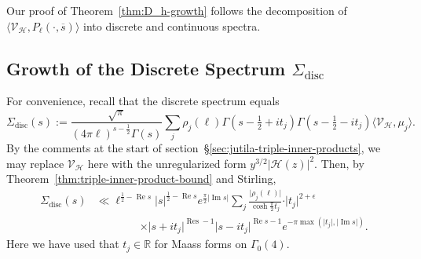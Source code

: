 \documentclass[11pt,reqno]{amsart}
\theoremstyle{plain}
\theoremstyle{definition}
\numberwithin{equation}{section}
\renewcommand{\Im}{\operatorname{Im}}
\renewcommand{\Re}{\operatorname{Re}}
\DeclareMathOperator*{\Res}{Res}
\begin{document}
Our proof of Theorem~\ref{thm:D_h-growth} follows the decomposition of $\langle \mathcal{V}_\mathcal{H}, P_\ell(\cdot,\overline{s}) \rangle$ into discrete and continuous spectra.

\subsection{Growth of the Discrete Spectrum \texorpdfstring{$\Sigma_{\mathrm{disc}}$}{}}

For convenience, recall that the discrete spectrum equals
\[
\Sigma_{\mathrm{disc}}(s) 
		:=  \frac{\sqrt{\pi}}{(4\pi \ell)^{s-\frac{1}{2}} \Gamma(s)}
		\sum_j \rho_j(\ell) \Gamma(s - \tfrac{1}{2} + it_j)\Gamma(s- \tfrac{1}{2} -it_j)
			\langle \mathcal{V}_\mathcal{H}, \mu_j \rangle.
\]
By the comments at the start of section~\S{\ref{sec:jutila-triple-inner-products}}, we may replace $\mathcal{V}_\mathcal{H}$ here with the unregularized form $y^{3/2} \vert \mathcal{H}(z) \vert^2$. Then, by Theorem~\ref{thm:triple-inner-product-bound} and Stirling,
\begin{align*}
	\Sigma_{\mathrm{disc}}(s)
	& \ll \ell^{\frac{1}{2}-\Re s} \vert s \vert^{\frac{1}{2}-\Re s}
		e^{\frac{\pi}{2} \vert \Im s \vert}
	\sum_j \frac{\vert \rho_j(\ell)\vert}{\cosh \frac{\pi}{2} t_j} \cdot \vert t_j \vert^{2+\epsilon} \\
	& \qquad \qquad \times 
	\vert s + it_j \vert^{\Res - 1} \vert s - it_j \vert^{\Re s -1}
	e^{-\pi \max(\vert t_j \vert, \vert \Im s \vert)}.
\end{align*}
Here we have used that $t_j \in \mathbb{R}$ for Maass forms on $\Gamma_0(4)$.
\end{document}

